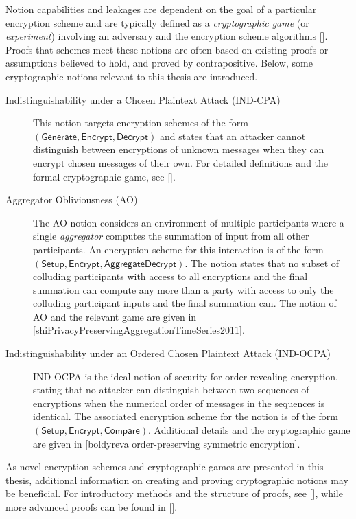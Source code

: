 Notion capabilities and leakages are dependent on the goal of a particular encryption scheme and are typically defined as a \textit{cryptographic game} (or \textit{experiment}) involving an adversary and the encryption scheme algorithms []. Proofs that schemes meet these notions are often based on existing proofs or assumptions believed to hold, and proved by contrapositive. Below, some cryptographic notions relevant to this thesis are introduced.
\begin{description}
    \item[Indistinguishability under a Chosen Plaintext Attack (IND-CPA)] This notion targets encryption schemes of the form $(\mathsf{Generate},\mathsf{Encrypt},\mathsf{Decrypt})$ and states that an attacker cannot distinguish between encryptions of unknown messages when they can encrypt chosen messages of their own. For detailed definitions and the formal cryptographic game, see [].
    \item[Aggregator Obliviousness (AO)] The AO notion considers an environment of multiple participants where a single \textit{aggregator} computes the summation of input from all other participants. An encryption scheme for this interaction is of the form $(\mathsf{Setup},\mathsf{Encrypt},\mathsf{AggregateDecrypt})$. The notion states that no subset of colluding participants with access to all encryptions and the final summation can compute any more than a party with access to only the colluding participant inputs and the final summation can. The notion of AO and the relevant game are given in [shiPrivacyPreservingAggregationTimeSeries2011].
    \item[Indistinguishability under an Ordered Chosen Plaintext Attack (IND-OCPA)] IND-OCPA is the ideal notion of security for order-revealing encryption, stating that no attacker can distinguish between two sequences of encryptions when the numerical order of messages in the sequences is identical. The associated encryption scheme for the notion is of the form $(\mathsf{Setup},\mathsf{Encrypt},\mathsf{Compare})$. Additional details and the cryptographic game are given in [boldyreva order-preserving symmetric encryption].
\end{description}
As novel encryption schemes and cryptographic games are presented in this thesis, additional information on creating and proving cryptographic notions may be beneficial. For introductory methods and the structure of proofs, see [], while more advanced proofs can be found in [].

% 
% 

